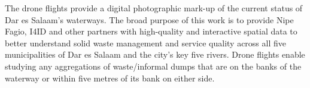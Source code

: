 \documentclass[a4paper,12pt,twoside]{article}
\begin{document}
\begin{multicols}{2}
The drone flights provide a digital photographic mark-up of the current status of Dar es Salaam’s waterways. The broad purpose of this work is to provide Nipe Fagio, I4ID and other partners with high-quality and interactive spatial data to better understand solid waste management and service quality across all five municipalities of Dar es Salaam and the city’s key five rivers. Drone flights enable studying any aggregations of waste/informal dumps that are on the banks of the waterway or within five metres of its bank on either side.

\end{multicols}


\end{document}
